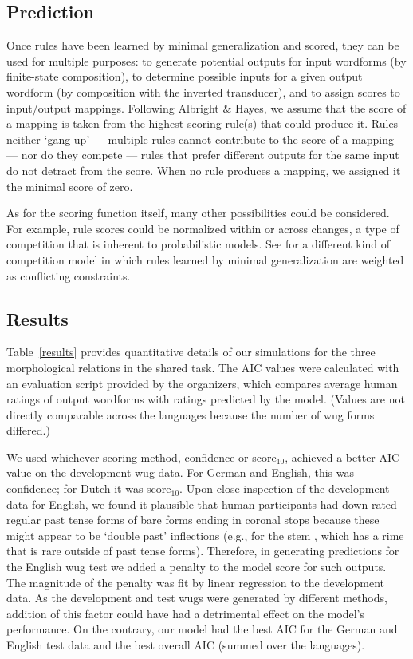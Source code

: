 \documentclass[11pt]{article}
\begin{document}
\subsection{Prediction}

Once rules have been learned by minimal generalization and scored, they can be used for multiple purposes: to generate potential outputs for input wordforms (by finite-state composition), to determine possible inputs for a given output wordform (by composition with the inverted transducer), and to assign scores to input/output mappings. Following Albright \& Hayes, we assume that the score of a mapping is taken from the highest-scoring rule(s) that could produce it. Rules neither `gang up' --- multiple rules cannot contribute to the score of a mapping --- nor do they compete --- rules that prefer different outputs for the same input do not detract from the score. When no rule produces a mapping, we assigned it the minimal score of zero.

As for the scoring function itself, many other possibilities could be considered. For example, rule scores could be normalized within or across changes, a type of competition that is inherent to probabilistic models. See \citet{albright2006} for a different kind of competition model in which rules learned by minimal generalization are weighted as conflicting constraints.

\subsection{Results}

Table~\ref{results} provides quantitative details of our simulations for the three morphological relations in the shared task. The AIC values were calculated with an evaluation script provided by the organizers, which compares average human ratings of output wordforms with ratings predicted by the model. (Values are not directly comparable across the languages because the number of wug forms differed.)

We used whichever scoring method, confidence or score$_{10}$, achieved a better AIC value on the development wug data. For German and English, this was confidence; for Dutch it was score$_{10}$. Upon close inspection of the development data for English, we found it plausible that human participants had down-rated regular past tense forms of bare forms ending in coronal stops  because these might appear to be `double past' inflections (e.g.,  for the stem , which has a rime  that is rare outside of past tense forms). Therefore, in generating predictions for the English wug test we added a penalty to the model score for such outputs. The magnitude of the penalty was fit by linear regression to the development data. As the development and test wugs were generated by different methods, addition of this factor could have had a detrimental effect on the model's performance. On the contrary, our model had the best AIC for the German and English test data and the best overall AIC (summed over the languages).
\end{document}
